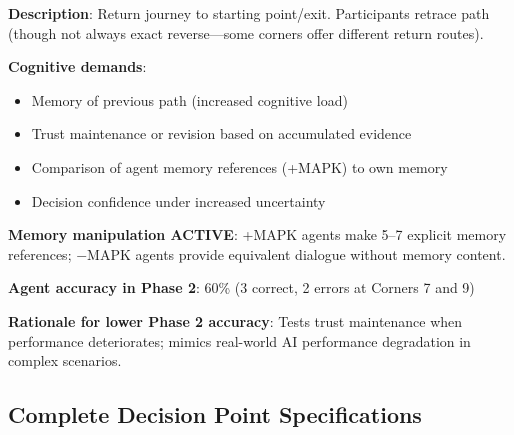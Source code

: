 \documentclass[12pt]{article}
\begin{document}
\textbf{Description}: Return journey to starting point/exit. Participants retrace path (though not always exact reverse---some corners offer different return routes).

\textbf{Cognitive demands}:
\begin{itemize}
    \item Memory of previous path (increased cognitive load)
    \item Trust maintenance or revision based on accumulated evidence
    \item Comparison of agent memory references (+MAPK) to own memory
    \item Decision confidence under increased uncertainty
\end{itemize}

\textbf{Memory manipulation ACTIVE}: +MAPK agents make 5--7 explicit memory references; $-$MAPK agents provide equivalent dialogue without memory content.

\textbf{Agent accuracy in Phase 2}: 60\% (3 correct, 2 errors at Corners 7 and 9)

\textbf{Rationale for lower Phase 2 accuracy}: Tests trust maintenance when performance deteriorates; mimics real-world AI performance degradation in complex scenarios.

\subsection{Complete Decision Point Specifications}
\end{document}
